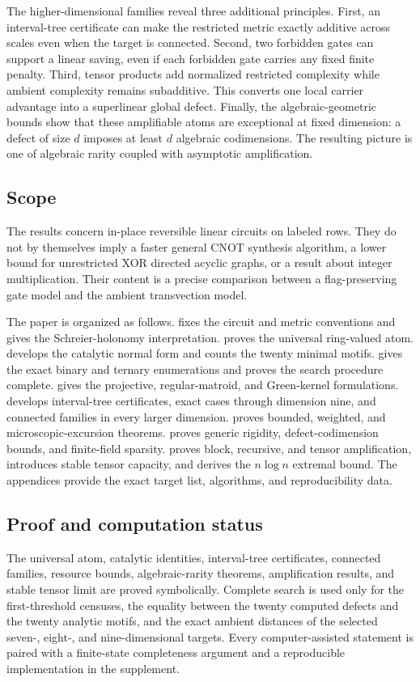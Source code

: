 \documentclass[11pt]{amsart}
\numberwithin{equation}{section}
\theoremstyle{definition}
\theoremstyle{remark}
\begin{document}
The higher-dimensional families reveal three additional principles.  First, an interval-tree certificate can make the restricted metric exactly additive across scales even when the target is connected.  Second, two forbidden gates can support a linear saving, even if each forbidden gate carries any fixed finite penalty.  Third, tensor products add normalized restricted complexity while ambient complexity remains subadditive.  This converts one local carrier advantage into a superlinear global defect.  Finally, the algebraic-geometric bounds show that these amplifiable atoms are exceptional at fixed dimension: a defect of size $d$ imposes at least $d$ algebraic codimensions.  The resulting picture is one of algebraic rarity coupled with asymptotic amplification.

\subsection*{Scope}

The results concern in-place reversible linear circuits on labeled rows.  They do not by themselves imply a faster general CNOT synthesis algorithm, a lower bound for unrestricted XOR directed acyclic graphs, or a result about integer multiplication.  Their content is a precise comparison between a flag-preserving gate model and the ambient transvection model.

The paper is organized as follows.   fixes the circuit and metric conventions and gives the Schreier-holonomy interpretation.   proves the universal ring-valued atom.   develops the catalytic normal form and counts the twenty minimal motifs.   gives the exact binary and ternary enumerations and proves the search procedure complete.   gives the projective, regular-matroid, and Green-kernel formulations.   develops interval-tree certificates, exact cases through dimension nine, and connected families in every larger dimension.   proves bounded, weighted, and microscopic-excursion theorems.   proves generic rigidity, defect-codimension bounds, and finite-field sparsity.   proves block, recursive, and tensor amplification, introduces stable tensor capacity, and derives the $n\log n$ extremal bound.  The appendices provide the exact target list, algorithms, and reproducibility data.

\subsection*{Proof and computation status}
The universal atom, catalytic identities, interval-tree certificates, connected families, resource bounds, algebraic-rarity theorems, amplification results, and stable tensor limit are proved symbolically.  Complete search is used only for the first-threshold censuses, the equality between the twenty computed defects and the twenty analytic motifs, and the exact ambient distances of the selected seven-, eight-, and nine-dimensional targets.  Every computer-assisted statement is paired with a finite-state completeness argument and a reproducible implementation in the supplement.
\end{document}
